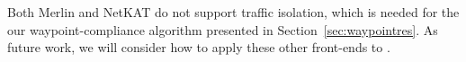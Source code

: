 Both Merlin and NetKAT  do not support traffic isolation, which is needed for the 
our waypoint-compliance algorithm presented in Section~\ref{sec:waypointres}.
As future work, we will consider how to apply these other front-ends to \name.



 
